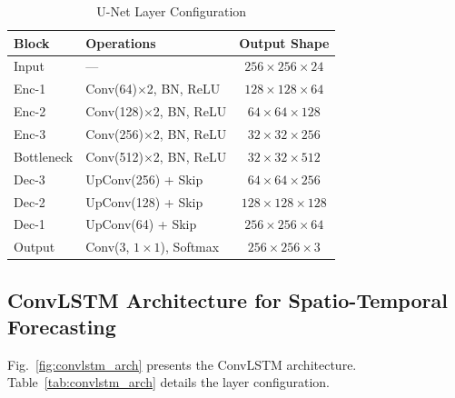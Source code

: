 \documentclass[conference]{IEEEtran}
\begin{document}
\begin{table}[htbp]
\caption{U-Net Layer Configuration}
\label{tab:unet_arch}
\centering
\footnotesize
\begin{tabular}{llc}
\toprule
\textbf{Block} & \textbf{Operations} & \textbf{Output Shape}\\
\midrule
Input      & ---                            & $256\!\times\!256\!\times\!24$\\
Enc-1      & Conv(64)$\times$2, BN, ReLU    & $128\!\times\!128\!\times\!64$\\
Enc-2      & Conv(128)$\times$2, BN, ReLU   & $64\!\times\!64\!\times\!128$\\
Enc-3      & Conv(256)$\times$2, BN, ReLU   & $32\!\times\!32\!\times\!256$\\
Bottleneck & Conv(512)$\times$2, BN, ReLU   & $32\!\times\!32\!\times\!512$\\
Dec-3      & UpConv(256) + Skip             & $64\!\times\!64\!\times\!256$\\
Dec-2      & UpConv(128) + Skip             & $128\!\times\!128\!\times\!128$\\
Dec-1      & UpConv(64) + Skip              & $256\!\times\!256\!\times\!64$\\
Output     & Conv(3, $1\!\times\!1$), Softmax & $256\!\times\!256\!\times\!3$\\
\bottomrule
\end{tabular}
\end{table}

\subsection{ConvLSTM Architecture for Spatio-Temporal Forecasting}

Fig.~\ref{fig:convlstm_arch} presents the ConvLSTM architecture.
Table~\ref{tab:convlstm_arch} details the layer configuration.
\end{document}
